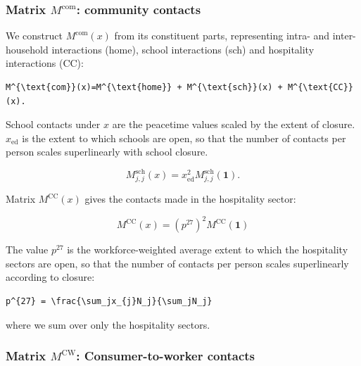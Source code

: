 \documentclass[
]{article}
\begin{document}
\hypertarget{matrix-mtextcom-community-contacts}{%
\subsubsection{\texorpdfstring{Matrix \(M^{\text{com}}\): community contacts}{Matrix M\^{}\{\textbackslash text\{com\}\}: community contacts}}\label{matrix-mtextcom-community-contacts}}

We construct \(M^{\text{com}}(x)\) from its constituent parts, representing intra- and inter-household interactions (home), school interactions (sch) and hospitality interactions (CC):

\begin{verbatim}
M^{\text{com}}(x)=M^{\text{home}} + M^{\text{sch}}(x) + M^{\text{CC}}(x).
\end{verbatim}

School contacts under \(x\) are the peacetime values scaled by the extent of closure. \(x_{\text{ed}}\) is the extent to which schools are open, so that the number of contacts per person scales superlinearly with school closure.

\begin{equation}
M_{j,j}^{\text{sch}}(x)=x_{\text{ed}}^2M_{j,j}^{\text{sch}}(\textbf{1}).
\label{eq:school}
\end{equation}

Matrix \(M^{\text{CC}}(x)\) gives the contacts made in the hospitality sector:

\begin{equation}
M^{\text{CC}}(x) = (p^{27})^2M^{\text{CC}}(\textbf{1})
\label{eq:hosp}
\end{equation}

The value \(p^{27}\) is the workforce-weighted average extent to which the hospitality sectors are open, so that the number of contacts per person scales superlinearly according to closure:

\begin{verbatim}
p^{27} = \frac{\sum_jx_{j}N_j}{\sum_jN_j}
\end{verbatim}

where we sum over only the hospitality sectors.

\hypertarget{matrix-mtextcw-consumer-to-worker-contacts}{%
\subsubsection{\texorpdfstring{Matrix \(M^{\text{CW}}\): Consumer-to-worker contacts}{Matrix M\^{}\{\textbackslash text\{CW\}\}: Consumer-to-worker contacts}}\label{matrix-mtextcw-consumer-to-worker-contacts}}
\end{document}
